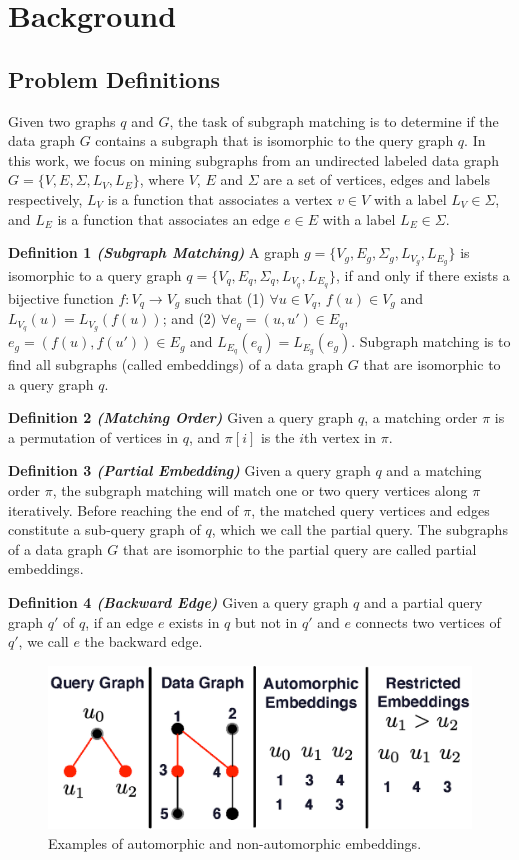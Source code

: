 \section{Background}
\subsection{Problem Definitions}
Given two graphs $q$ and $G$, the task of subgraph matching is to determine if the data graph $G$ contains a subgraph that is isomorphic to
the query graph $q$. In this work, we focus on mining subgraphs from an undirected labeled data graph $G=\{V,E,\Sigma,L_V,L_E\}$, where
$V$, $E$ and $\Sigma$ are a set of vertices, edges and labels respectively,  $L_V$ is a function that associates a vertex $v \in V$ with a
label $L_V \in \Sigma$, and $L_E$ is a function that associates an edge $e \in E$ with a label $L_E \in \Sigma$.


\noindent
\textbf{Definition 1 \emph{(Subgraph Matching)}} A graph $g=\{V_g,E_g,\Sigma_g,L_{V_g},L_{E_g}\}$ is isomorphic to a query graph $q=\{V_q,E_q,\Sigma_q,L_{V_q},L_{E_q}\}$, if and only if there exists a bijective function $f: V_q \rightarrow V_g$ such that (1) $\forall u \in V_q$, $f(u) \in V_g$ and $L_{V_q}(u) = L_{V_g}(f(u))$; and (2) $\forall e_q=(u,u') \in E_q$, $e_g=(f(u),f(u')) \in E_g$ and $L_{E_q}(e_q)=L_{E_g}(e_g)$. Subgraph matching is to find all subgraphs (called embeddings) of a data graph $G$ that are isomorphic to a query graph $q$.

\noindent
\textbf{Definition 2 \emph{(Matching Order)}} Given a query graph $q$, a matching order $\pi$ is a permutation of vertices in $q$, and $\pi[i]$ is the $i$th vertex in $\pi$.

\noindent
\textbf{Definition 3 \emph{(Partial Embedding)}} Given a query graph $q$ and a matching order $\pi$, the subgraph matching will match one or two query vertices along $\pi$ iteratively. Before reaching the end of $\pi$, the matched query vertices and edges constitute a sub-query graph of $q$, which we call the partial query. The subgraphs of a data graph $G$ that are isomorphic to the partial query are called partial embeddings.

\noindent
\textbf{Definition 4 \emph{(Backward Edge)}} Given a query graph $q$ and a partial query graph $q'$ of $q$, if an edge $e$ exists in $q$ but not in $q'$ and $e$ connects two vertices of $q'$, we call $e$ the backward edge.

\begin{figure}
\centering
\includegraphics[width=\columnwidth]{./figure/automorphism.eps}
\caption{Examples of automorphic and non-automorphic embeddings.}	
\label{fig:automo}
\end{figure}

